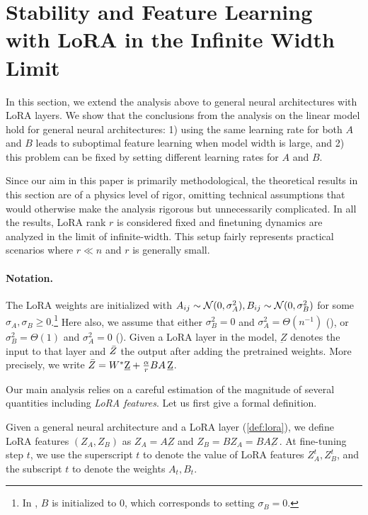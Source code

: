 \section{Stability and Feature Learning with LoRA in the Infinite Width Limit}\label{sec:main_theory}

In this section, we extend the analysis above to general neural architectures with LoRA layers. We show that the conclusions from the analysis on the linear model hold for general neural architectures: 1) using the same learning rate for both $A$ and $B$ leads to suboptimal feature learning when model width is large, and  2) this problem can be fixed by setting different learning rates for $A$ and $B$. 

Since our aim in this paper is primarily methodological, the theoretical results in this section are of a physics level of rigor, omitting technical assumptions that would otherwise make the analysis rigorous but unnecessarily complicated. In all the results, LoRA rank $r$ is considered fixed and finetuning dynamics are analyzed in the limit of infinite-width. This setup fairly represents practical scenarios where $r \ll n$ and $r$ is generally small.
\vspace{-0.3cm}
\paragraph{Notation.} The LoRA weights are initialized with $A_{ij} \sim \mathcal{N}(0,\sigma_A^2), B_{ij} \sim \mathcal{N}(0,\sigma_B^2)$ for some $\sigma_A, \sigma_B \geq 0$.\footnote{In \cite{hu2021lora}, $B$ is initialized to $0$, which corresponds to setting $\sigma_B = 0$.} Here also, we assume that either $\sigma_B^2 = 0$ and $\sigma_A^2 = \Theta(n^{-1})$ (), or $\sigma_B^2 = \Theta(1)$ and $\sigma_A^2 = 0$ (). Given a LoRA layer in the model, $\underbar{Z}$ denotes the input to that layer and $\Bar{Z}$ the output after adding the pretrained weights. More precisely, we write $\Bar{Z} = W^*\underbar{Z} + \frac{\alpha}{r}BA\,\underbar{Z}$.

Our main analysis relies on a careful estimation of the magnitude of several quantities including \emph{LoRA features}. Let us first give a formal definition.
\begin{defn}\label{def:lora_features}
Given a general neural architecture and a LoRA layer (\cref{def:lora}), we define LoRA features $(Z_A, Z_B)$ as $Z_A = A \underbar{Z}$ and $Z_B = B Z_A = BA \underbar{Z}$\,.
At fine-tuning step $t$, we use the superscript $t$ to denote the value of LoRA features $Z_A^t, Z_B^t$, and the subscript $t$ to denote the weights $A_t, B_t$. 
\end{defn}

